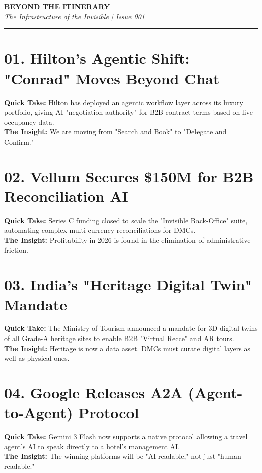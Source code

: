 \documentclass[11pt, a4paper]{article}
\begin{document}
\begin{flushleft}
    {\Huge \textbf{BEYOND THE ITINERARY}} \\
    \vspace{4pt}
    \textit{\large The Infrastructure of the Invisible | Issue 001} \\
    \vspace{8pt}
    \rule{\textwidth}{1.5pt}
\end{flushleft}

\vspace{10pt}

\section{01. Hilton’s Agentic Shift: "Conrad" Moves Beyond Chat}
\textbf{Quick Take:} Hilton has deployed an agentic workflow layer across its luxury portfolio, giving AI "negotiation authority" for B2B contract terms based on live occupancy data. \\
\textbf{\color{accentred}The Insight:} We are moving from "Search and Book" to "Delegate and Confirm."

\section{02. Vellum Secures \$150M for B2B Reconciliation AI}
\textbf{Quick Take:} Series C funding closed to scale the "Invisible Back-Office" suite, automating complex multi-currency reconciliations for DMCs. \\
\textbf{\color{accentred}The Insight:} Profitability in 2026 is found in the elimination of administrative friction.

\section{03. India’s "Heritage Digital Twin" Mandate}
\textbf{Quick Take:} The Ministry of Tourism announced a mandate for 3D digital twins of all Grade-A heritage sites to enable B2B "Virtual Recce" and AR tours. \\
\textbf{\color{accentred}The Insight:} Heritage is now a data asset. DMCs must curate digital layers as well as physical ones.

\section{04. Google Releases A2A (Agent-to-Agent) Protocol}
\textbf{Quick Take:} Gemini 3 Flash now supports a native protocol allowing a travel agent's AI to speak directly to a hotel's management AI. \\
\textbf{\color{accentred}The Insight:} The winning platforms will be "AI-readable," not just "human-readable."
\end{document}
